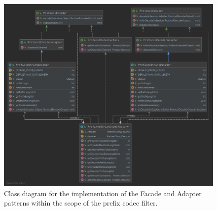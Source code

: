 \begin{figure}[H]
    \centering
    \includegraphics[width = \textwidth]{images/class_diagrams/adapter_facade_pattern.png}
    \caption{Class diagram for the implementation of the Facade and Adapter patterns within the scope of the prefix codec filter.}
    \label{fig:cd_facade}
\end{figure}

